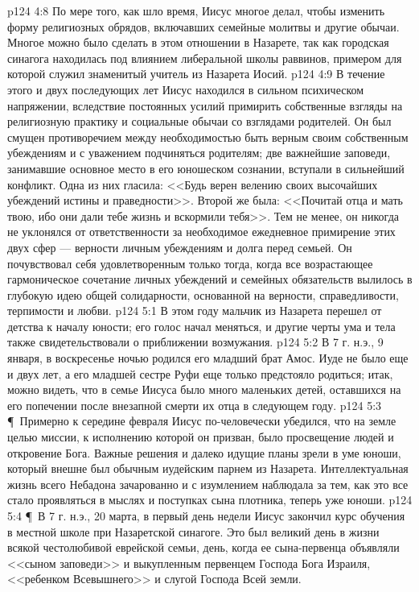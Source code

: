\vs p124 4:8 По мере того, как шло время, Иисус многое делал, чтобы изменить форму религиозных обрядов, включавших семейные молитвы и другие обычаи. Многое можно было сделать в этом отношении в Назарете, так как городская синагога находилась под влиянием либеральной школы раввинов, примером для которой служил знаменитый учитель из Назарета Иосий.
\vs p124 4:9 В течение этого и двух последующих лет Иисус находился в сильном психическом напряжении, вследствие постоянных усилий примирить собственные взгляды на религиозную практику и социальные обычаи со взглядами родителей. Он был смущен противоречием между необходимостью быть верным своим собственным убеждениям и с уважением подчиняться родителям; две важнейшие заповеди, занимавшие основное место в его юношеском сознании, вступали в сильнейший конфликт. Одна из них гласила: <<Будь верен велению своих высочайших убеждений истины и праведности>>. Второй же была: <<Почитай отца и мать твою, ибо они дали тебе жизнь и вскормили тебя>>. Тем не менее, он никогда не уклонялся от ответственности за необходимое ежедневное примирение этих двух сфер --- верности личным убеждениям и долга перед семьей. Он почувствовал себя удовлетворенным только тогда, когда все возрастающее гармоническое сочетание личных убеждений и семейных обязательств вылилось в глубокую идею общей солидарности, основанной на верности, справедливости, терпимости и любви.
\vs p124 5:1 В этом году мальчик из Назарета перешел от детства к началу юности; его голос начал меняться, и другие черты ума и тела также свидетельствовали о приближении возмужания.
\vs p124 5:2 В 7 г. н.э., 9 января, в воскресенье ночью родился его младший брат Амос. Иуде не было еще и двух лет, а его младшей сестре Руфи еще только предстояло родиться; итак, можно видеть, что в семье Иисуса было много маленьких детей, оставшихся на его попечении после внезапной смерти их отца в следующем году.
\vs p124 5:3 \P\ Примерно к середине февраля Иисус по\hyp{}человечески убедился, что на земле целью миссии, к исполнению которой он призван, было просвещение людей и откровение Бога. Важные решения и далеко идущие планы зрели в уме юноши, который внешне был обычным иудейским парнем из Назарета. Интеллектуальная жизнь всего Небадона зачарованно и с изумлением наблюдала за тем, как это все стало проявляться в мыслях и поступках сына плотника, теперь уже юноши.
\vs p124 5:4 \P\ В 7 г. н.э., 20 марта, в первый день недели Иисус закончил курс обучения в местной школе при Назаретской синагоге. Это был великий день в жизни всякой честолюбивой еврейской семьи, день, когда ее сына\hyp{}первенца объявляли <<сыном заповеди>> и выкупленным первенцем Господа Бога Израиля, <<ребенком Всевышнего>> и слугой Господа Всей земли.
